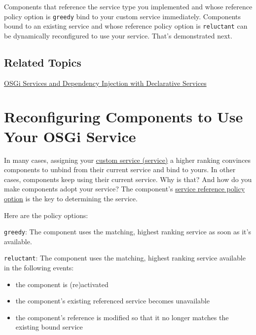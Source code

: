 Components that reference the service type you implemented and whose
reference policy option is \texttt{greedy} bind to your custom service
immediately. Components bound to an existing service and whose reference
policy option is \texttt{reluctant} can be dynamically reconfigured to
use your service. That's demonstrated next.

\section{Related Topics}\label{related-topics-32}

\href{/docs/7-2/frameworks/-/knowledge_base/f/declarative-services}{OSGi
Services and Dependency Injection with Declarative Services}

\chapter{Reconfiguring Components to Use Your OSGi
Service}\label{reconfiguring-components-to-use-your-osgi-service}

In many cases, assigning your
\href{/docs/7-2/customization/-/knowledge_base/c/creating-a-custom-osgi-service}{custom
service (service)} a higher ranking convinces components to unbind from
their current service and bind to yours. In other cases, components keep
using their current service. Why is that? And how do you make components
adopt your service? The component's
\href{/docs/7-2/customization/-/knowledge_base/c/examining-an-osgi-service-to-override\#step-3-gather-reference-configuration-details-if-reconfiguration-is-needed}{service
reference policy option} is the key to determining the service.

Here are the policy options:

\texttt{greedy}: The component uses the matching, highest ranking
service as soon as it's available.

\texttt{reluctant}: The component uses the matching, highest ranking
service available in the following events:

\begin{itemize}
\tightlist
\item
  the component is (re)activated
\item
  the component's existing referenced service becomes unavailable
\item
  the component's reference is modified so that it no longer matches the
  existing bound service
\end{itemize}


